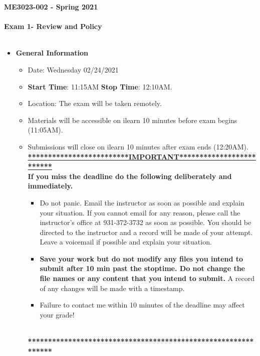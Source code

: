 \documentclass[11pt]{article}
\newcommand{\EXAMNUM}{1\hspace{0mm}}
\begin{document}
\textbf{ \LARGE ME3023-002 - Spring 2021} \\ \\
\textbf{ \LARGE \hspace*{5mm} Exam \EXAMNUM \hspace{2mm}- Review and Policy  } \\\\

\begin{itemize}
	\item  \textbf{\Large General Information}

	\begin{itemize}

		\item Date: Wednesday 02/24/2021
		\item {\bf Start Time}: 11:15AM {\bf Stop Time}: 12:10AM.
		\item Location: The exam will be taken remotely. 
		 
		\item Materials will be accessible on ilearn 10 minutes before exam begins (11:05AM).
		\item Submissions will close on ilearn 10 minutes after exam ends (12:20AM). \vspace{1mm}\\
		
		{\R  \bf \underline{*************************IMPORTANT*************************}} \vspace{3mm}\\
			  {\R \bf If you miss the deadline do the following deliberately and immediately. }
		\begin{itemize}
			\item Do not panic. Email the instructor as soon as possible and explain your situation. If you cannot email for any reason, please call the instructor's office at 931-372-3732 as soon as possible. You should be directed to the instructor and a record will be made of your attempt. Leave a voicemail if possible and explain your situation.
			\item{\bf  Save your work but do not modify any files you intend to submit after 10 min past the stoptime. Do not change the file names or any content that you intend to submit.} A record of any changes will be made with a timestamp. \vspace{2mm}
			\item {\R Failure to contact me within 10 minutes of the deadline may affect your grade!}
		\end{itemize}
			{\R  \bf \underline{\hspace{140mm}}} \\
			{\R  \bf ***************************************************************} 
	\end{itemize}


\end{itemize}
\end{document}
